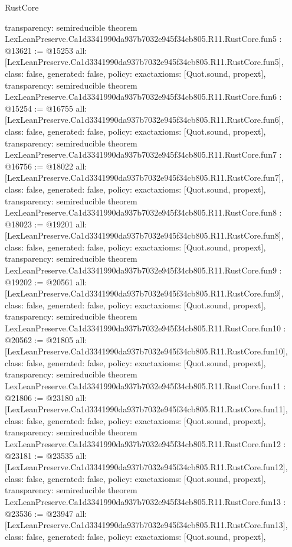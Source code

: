 \begin{lexlean}{RustCore}
\begin{coremodule}
{  transparency: semireducible
}
theorem LexLeanPreserve.Ca1d3341990da937b7032e945f34cb805.R11.RustCore.fun5 : @13621 := @15253 {
  all: [LexLeanPreserve.Ca1d3341990da937b7032e945f34cb805.R11.RustCore.fun5],
  class: false,
  generated: false,
  policy: exact{axioms: [Quot.sound, propext]},
  transparency: semireducible
}
theorem LexLeanPreserve.Ca1d3341990da937b7032e945f34cb805.R11.RustCore.fun6 : @15254 := @16755 {
  all: [LexLeanPreserve.Ca1d3341990da937b7032e945f34cb805.R11.RustCore.fun6],
  class: false,
  generated: false,
  policy: exact{axioms: [Quot.sound, propext]},
  transparency: semireducible
}
theorem LexLeanPreserve.Ca1d3341990da937b7032e945f34cb805.R11.RustCore.fun7 : @16756 := @18022 {
  all: [LexLeanPreserve.Ca1d3341990da937b7032e945f34cb805.R11.RustCore.fun7],
  class: false,
  generated: false,
  policy: exact{axioms: [Quot.sound, propext]},
  transparency: semireducible
}
theorem LexLeanPreserve.Ca1d3341990da937b7032e945f34cb805.R11.RustCore.fun8 : @18023 := @19201 {
  all: [LexLeanPreserve.Ca1d3341990da937b7032e945f34cb805.R11.RustCore.fun8],
  class: false,
  generated: false,
  policy: exact{axioms: [Quot.sound, propext]},
  transparency: semireducible
}
theorem LexLeanPreserve.Ca1d3341990da937b7032e945f34cb805.R11.RustCore.fun9 : @19202 := @20561 {
  all: [LexLeanPreserve.Ca1d3341990da937b7032e945f34cb805.R11.RustCore.fun9],
  class: false,
  generated: false,
  policy: exact{axioms: [Quot.sound, propext]},
  transparency: semireducible
}
theorem LexLeanPreserve.Ca1d3341990da937b7032e945f34cb805.R11.RustCore.fun10 : @20562 := @21805 {
  all: [LexLeanPreserve.Ca1d3341990da937b7032e945f34cb805.R11.RustCore.fun10],
  class: false,
  generated: false,
  policy: exact{axioms: [Quot.sound, propext]},
  transparency: semireducible
}
theorem LexLeanPreserve.Ca1d3341990da937b7032e945f34cb805.R11.RustCore.fun11 : @21806 := @23180 {
  all: [LexLeanPreserve.Ca1d3341990da937b7032e945f34cb805.R11.RustCore.fun11],
  class: false,
  generated: false,
  policy: exact{axioms: [Quot.sound, propext]},
  transparency: semireducible
}
theorem LexLeanPreserve.Ca1d3341990da937b7032e945f34cb805.R11.RustCore.fun12 : @23181 := @23535 {
  all: [LexLeanPreserve.Ca1d3341990da937b7032e945f34cb805.R11.RustCore.fun12],
  class: false,
  generated: false,
  policy: exact{axioms: [Quot.sound, propext]},
  transparency: semireducible
}
theorem LexLeanPreserve.Ca1d3341990da937b7032e945f34cb805.R11.RustCore.fun13 : @23536 := @23947 {
  all: [LexLeanPreserve.Ca1d3341990da937b7032e945f34cb805.R11.RustCore.fun13],
  class: false,
  generated: false,
  policy: exact{axioms: [Quot.sound, propext]},
}
\end{coremodule}
\end{lexlean}

